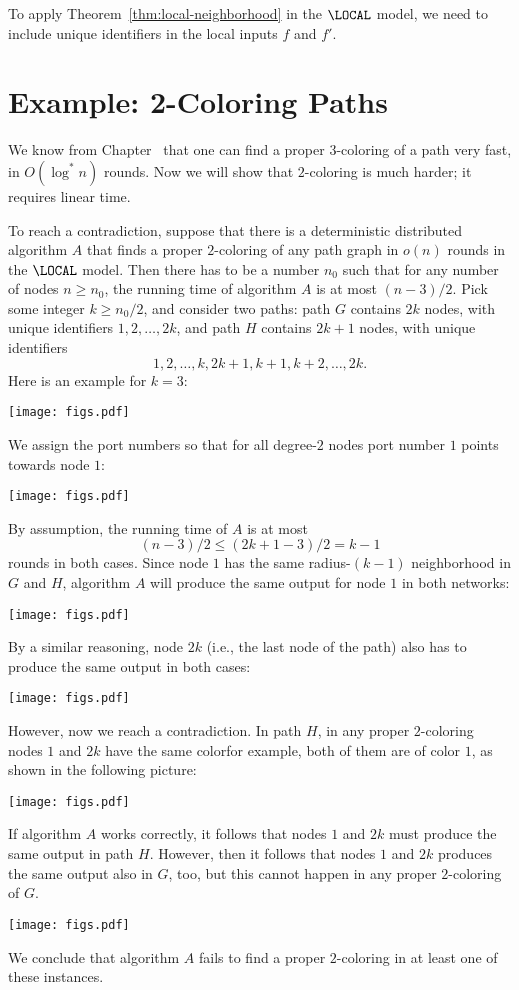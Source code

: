 To apply Theorem~\ref{thm:local-neighborhood} in the $\LOCAL$ model, we need to include unique identifiers in the local inputs $f$ and $f'$.



\section{Example: 2-Coloring Paths}

We know from Chapter~ that one can find a proper $3$-coloring of a path very fast, in $O(\log^* n)$ rounds. Now we will show that $2$-coloring is much harder; it requires linear time.

To reach a contradiction, suppose that there is a deterministic distributed algorithm $A$ that finds a proper $2$-coloring of any path graph in $o(n)$ rounds in the $\LOCAL$ model. Then there has to be a number $n_0$ such that for any number of nodes $n \ge n_0$, the running time of algorithm $A$ is at most $(n-3)/2$. Pick some integer $k \ge n_0/2$, and consider two paths: path $G$ contains $2k$ nodes, with unique identifiers $1,2,\dotsc,2k$, and path $H$ contains $2k+1$ nodes, with unique identifiers \[1,2,\dotsc,k,2k+1,k+1,k+2,\dotsc,2k.\] Here is an example for $k = 3$:
\begin{center}
    \texttt{[image: figs.pdf]}
\end{center}
We assign the port numbers so that for all degree-$2$ nodes port number $1$ points towards node $1$:
\begin{center}
    \texttt{[image: figs.pdf]}
\end{center}
By assumption, the running time of $A$ is at most
\[
    (n-3)/2 \le (2k+1-3)/2 = k-1
\]
rounds in both cases. Since node $1$ has the same radius-${(k-1)}$ neighborhood in $G$ and $H$, algorithm $A$ will produce the same output for node $1$ in both networks:
\begin{center}
    \texttt{[image: figs.pdf]}
\end{center}
By a similar reasoning, node $2k$ (i.e., the last node of the path) also has to produce the same output in both cases:
\begin{center}
    \texttt{[image: figs.pdf]}
\end{center}
However, now we reach a contradiction. In path $H$, in any proper $2$-coloring nodes $1$ and $2k$ have the same color\mydash for example, both of them are of color $1$, as shown in the following picture:
\begin{center}
    \texttt{[image: figs.pdf]}
\end{center}
If algorithm $A$ works correctly, it follows that nodes $1$ and $2k$ must produce the same output in path $H$. However, then it follows that nodes $1$ and $2k$ produces the same output also in $G$, too, but this cannot happen in any proper $2$-coloring of $G$.
\begin{center}
    \texttt{[image: figs.pdf]}
\end{center}
We conclude that algorithm $A$ fails to find a proper $2$-coloring in at least one of these instances.

